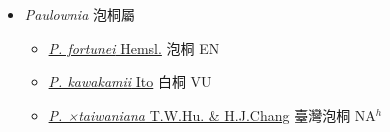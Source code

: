 
  \begin{itemize}
 \item[] \textit{Paulownia} 泡桐屬
                    
  \begin{itemize}
        \item[] \href{http://www.theplantlist.org/tpl1.1/search?q=Paulownia+fortunei}{\textit{P. fortunei} Hemsl.}   泡桐 EN
        \item[] \href{http://www.theplantlist.org/tpl1.1/search?q=Paulownia+kawakamii}{\textit{P. kawakamii} Ito}   白桐 VU
        \item[] \href{http://www.theplantlist.org/tpl1.1/search?q=Paulownia+×taiwaniana}{\textit{P. ×taiwaniana} T.W.Hu. \& H.J.Chang}   臺灣泡桐 NA$^h$
  \end{itemize}
  \end{itemize}
